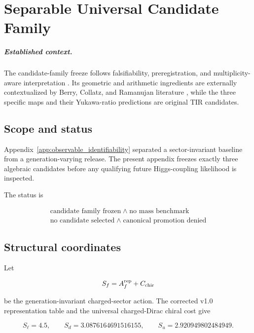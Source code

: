 \chapter{Separable Universal Candidate Family}
\label{app:separable_candidate_family}


\paragraph{Established context.}
The candidate-family freeze follows falsifiability, preregistration, and
multiplicity-aware interpretation \cite{Popper1959,Nosek2018,Munafo2017}.  Its
geometric and arithmetic ingredients are externally contextualized by Berry,
Collatz, and Ramanujan literature
\cite{berry1984,Lagarias1985,Tao2022Collatz,Ramanujan1918}, while the three
specific maps and their Yukawa-ratio predictions are original TIR candidates.

\section{Scope and status}

Appendix~\ref{app:observable_identifiability} separated a
sector-invariant baseline from a generation-varying release.  The present
appendix freezes exactly three algebraic candidates before any qualifying
future Higgs-coupling likelihood is inspected.

The status is

\[
\boxed{
\begin{gathered}
\text{candidate family frozen}
\;\land\;
\text{no mass benchmark}\\
\text{no candidate selected}
\;\land\;
\text{canonical promotion denied}
\end{gathered}
}
\]

\section{Structural coordinates}

Let

\[
S_f=A_f^{\rm rep}+C_{\rm chir}
\]

be the generation-invariant charged-sector action.  The corrected v1.0
representation table and the universal charged-Dirac chiral cost give

\[
S_\ell=4.5,
\qquad
S_d=3.0876164691516155,
\qquad
S_u=2.920949802484949.
\]

